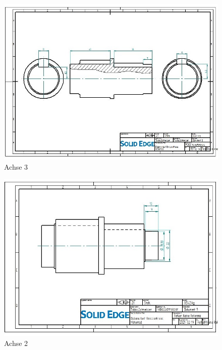 \begin{figure} [H]
	\begin{center}
		\includegraphics[angle=90]{figures/mechanik/Achse_mit_nuten_Zeichnung.jpg}
		\caption{Achse 3}
		\label{fig:Achse3}
	\end{center}
\end{figure}

\begin{figure} [H]
	\begin{center}
		\includegraphics[angle=90]{figures/mechanik/Achse_mit_nuten_20mm_Zeichnung.jpg}
		\caption{Achse 2}
		\label{fig:Achse2}
	\end{center}
\end{figure}

